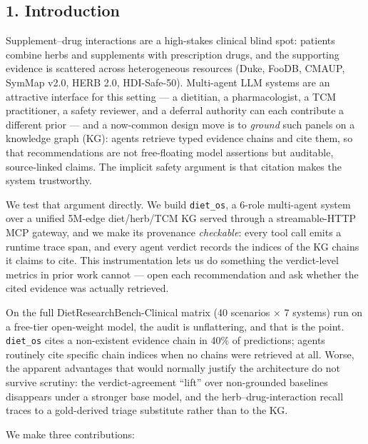 \documentclass[
]{article}
\begin{document}
\hypertarget{introduction}{%
\subsection{1. Introduction}\label{introduction}}

Supplement--drug interactions are a high-stakes clinical blind spot:
patients combine herbs and supplements with prescription drugs, and the
supporting evidence is scattered across heterogeneous resources (Duke,
FooDB, CMAUP, SymMap v2.0, HERB 2.0, HDI-Safe-50). Multi-agent LLM
systems are an attractive interface for this setting --- a dietitian, a
pharmacologist, a TCM practitioner, a safety reviewer, and a deferral
authority can each contribute a different prior --- and a now-common
design move is to \emph{ground} such panels on a knowledge graph (KG):
agents retrieve typed evidence chains and cite them, so that
recommendations are not free-floating model assertions but auditable,
source-linked claims. The implicit safety argument is that citation
makes the system trustworthy.

We test that argument directly. We build \texttt{diet\_os}, a 6-role
multi-agent system over a unified 5M-edge diet/herb/TCM KG served
through a streamable-HTTP MCP gateway, and we make its provenance
\emph{checkable}: every tool call emits a runtime trace span, and every
agent verdict records the indices of the KG chains it claims to cite.
This instrumentation lets us do something the verdict-level metrics in
prior work cannot --- open each recommendation and ask whether the cited
evidence was actually retrieved.

On the full DietResearchBench-Clinical matrix (40 scenarios × 7 systems)
run on a free-tier open-weight model, the audit is unflattering, and
that is the point. \texttt{diet\_os} cites a non-existent evidence chain
in 40\% of predictions; agents routinely cite specific chain indices
when no chains were retrieved at all. Worse, the apparent advantages
that would normally justify the architecture do not survive scrutiny:
the verdict-agreement ``lift'' over non-grounded baselines disappears
under a stronger base model, and the herb--drug-interaction recall
traces to a gold-derived triage substitute rather than to the KG.

We make three contributions:
\end{document}
